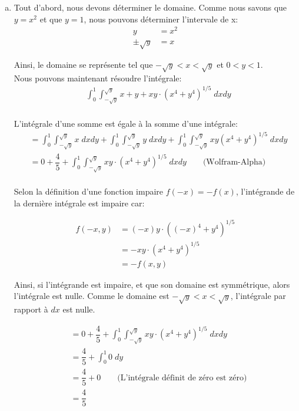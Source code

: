 \documentclass[letterpaper,12pt,oneside,final]{book}
\begin{document}
\begin{enumerate}[a)]

\item %
Tout d'abord, nous devons déterminer le domaine. Comme nous savons que $y = x^2$ et que $y = 1$, nous pouvons déterminer l'intervale de x:\\
\begin{align*}
    y &= x^2 \\
    \pm \sqrt{y} &= x 
\end{align*}

Ainsi, le domaine se représente tel que $-\sqrt{y} < x < \sqrt{y}$ et $0 < y < 1$. \\

Nous pouvons maintenant résoudre l'intégrale:
\begin{align*}
&\int_0^1 \int_{-\sqrt{y}}^{\sqrt{y}} x + y + xy\cdot(x^4+y^4)^{1/5}\;dxdy \\
\end{align*}

L'intégrale d'une somme est égale à la somme d'une intégrale:
\begin{align*}
&= \int_0^1 \int_{-\sqrt{y}}^{\sqrt{y}} x \; dxdy +
\int_0^1 \int_{-\sqrt{y}}^{\sqrt{y}} y \; dxdy +
\int_0^1 \int_{-\sqrt{y}}^{\sqrt{y}} xy (x^4+y^4)^{1/5}\; dxdy \\
&= 0 + \dfrac{4}{5} + \int_0^1 \int_{-\sqrt{y}}^{\sqrt{y}} xy\cdot(x^4+y^4)^{1/5}\; dxdy \qquad \text{(Wolfram-Alpha)} \\
\end{align*}

Selon la définition d'une fonction impaire $f(-x) = -f(x)$, l'intégrande de la dernière intégrale est impaire car:

\begin{align*}
    f(-x, y) &= (-x)y\cdot((-x)^4 + y^4)^{1/5} \\
    &=-xy\cdot(x^4 + y^4)^{1/5} \\
    &= -f(x, y)
\end{align*}

Ainsi, si l'intégrande est impaire, et que son domaine est symmétrique, alors l'intégrale est nulle. Comme le domaine est $-\sqrt{y} < x < \sqrt{y}$, l'intégrale par rapport à $dx$ est nulle.

\begin{align*}
    &= 0 + \dfrac{4}{5} + \int_0^1 \int_{-\sqrt{y}}^{\sqrt{y}} xy\cdot(x^4+y^4)^{1/5}\;dxdy \\
    &= \dfrac{4}{5} + \int_0^1 0\;dy \\
    &= \dfrac{4}{5} + 0 \qquad \text{(L'intégrale définit de zéro est zéro)} \\
    &= \dfrac{4}{5}
\end{align*}


\end{enumerate}
\end{document}
